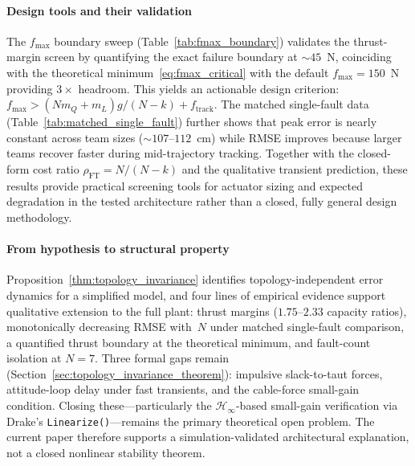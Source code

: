 \paragraph*{Design tools and their validation}
The $f_{\max}$ boundary sweep (Table~\ref{tab:fmax_boundary}) validates the thrust-margin screen by quantifying the exact failure boundary at ${\sim}45$~N, coinciding with the theoretical minimum~\eqref{eq:fmax_critical} with the default $f_{\max} = 150$~N providing $3\times$ headroom. This yields an actionable design criterion: $f_{\max} > (N m_Q + m_L)g/(N{-}k) + f_{\mathrm{track}}$. The matched single-fault data (Table~\ref{tab:matched_single_fault}) further shows that peak error is nearly constant across team sizes (${\sim}107$--$112$~cm) while RMSE improves because larger teams recover faster during mid-trajectory tracking. Together with the closed-form cost ratio $\rho_{\mathrm{FT}} = N/(N{-}k)$ and the qualitative transient prediction, these results provide practical screening tools for actuator sizing and expected degradation in the tested architecture rather than a closed, fully general design methodology.

\paragraph*{From hypothesis to structural property}
Proposition~\ref{thm:topology_invariance} identifies topology-independent error dynamics for a simplified model, and four lines of empirical evidence support qualitative extension to the full plant: thrust margins ($1.75$--$2.33$ capacity ratios), monotonically decreasing RMSE with~$N$ under matched single-fault comparison, a quantified thrust boundary at the theoretical minimum, and fault-count isolation at $N{=}7$. Three formal gaps remain (Section~\ref{sec:topology_invariance_theorem}): impulsive slack-to-taut forces, attitude-loop delay under fast transients, and the cable-force small-gain condition. Closing these---particularly the $\mathcal{H}_\infty$-based small-gain verification via Drake's \texttt{Linearize()}---remains the primary theoretical open problem. The current paper therefore supports a simulation-validated architectural explanation, not a closed nonlinear stability theorem.

